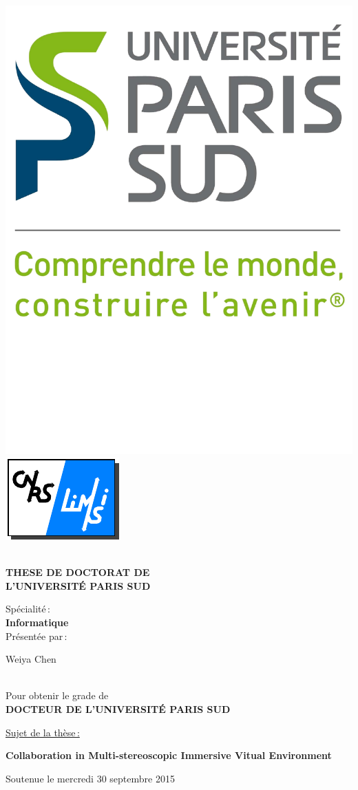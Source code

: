 \begin{titlepage}

\includegraphics[height=2.cm]{./logos/Logo_UPS.pdf}\hfill
\includegraphics[height=2.cm]{./logos/logo-limsi.pdf}\hfill
\\
\\

\begin{center}
  \begin{Large}
    \textbf{THESE DE DOCTORAT DE\\ L'UNIVERSIT\'E PARIS SUD\\}
  \end{Large}
  Sp\'ecialit\'e\,:\\
  \textbf{Informatique}\\ 
  Pr\'esent\'ee par\,:\\ 
  \begin{LARGE}
    Weiya Chen\end{LARGE}\\
  Pour obtenir le grade de\\
  \textbf{DOCTEUR DE L'UNIVERSIT\'E PARIS SUD}
\end{center}

\noindent \underline{Sujet de la thèse\,:}\\
\begin{center}
  \begin{Large}
    {\textbf{Collaboration in Multi-stereoscopic Immersive Vitual Environment}}
  \end{Large}
\end{center}

Soutenue le mercredi 30 septembre 2015\\


\end{titlepage}
